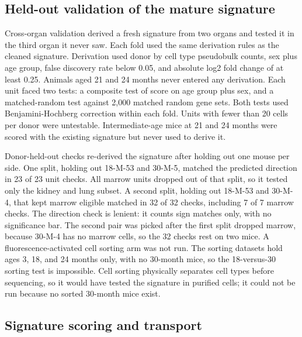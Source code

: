 \documentclass[11pt]{article}
\begin{document}
\subsection*{Held-out validation of the mature signature}

Cross-organ validation derived a fresh signature from two organs and tested it in the third organ it never saw. Each fold used the same derivation rules as the cleaned signature. Derivation used donor by cell type pseudobulk counts, sex plus age group, false discovery rate below 0.05, and absolute log2 fold change of at least 0.25. Animals aged 21 and 24 months never entered any derivation. Each unit faced two tests: a composite test of score on age group plus sex, and a matched-random test against 2,000 matched random gene sets. Both tests used Benjamini-Hochberg correction within each fold. Units with fewer than 20 cells per donor were untestable. Intermediate-age mice at 21 and 24 months were scored with the existing signature but never used to derive it.

Donor-held-out checks re-derived the signature after holding out one mouse per side. One split, holding out 18-M-53 and 30-M-5, matched the predicted direction in 23 of 23 unit checks. All marrow units dropped out of that split, so it tested only the kidney and lung subset. A second split, holding out 18-M-53 and 30-M-4, that kept marrow eligible matched in 32 of 32 checks, including 7 of 7 marrow checks. The direction check is lenient: it counts sign matches only, with no significance bar. The second pair was picked after the first split dropped marrow, because 30-M-4 has no marrow cells, so the 32 checks rest on two mice. A fluorescence-activated cell sorting arm was not run. The sorting datasets hold ages 3, 18, and 24 months only, with no 30-month mice, so the 18-versus-30 sorting test is impossible. Cell sorting physically separates cell types before sequencing, so it would have tested the signature in purified cells; it could not be run because no sorted 30-month mice exist.


\subsection*{Signature scoring and transport}
\end{document}
